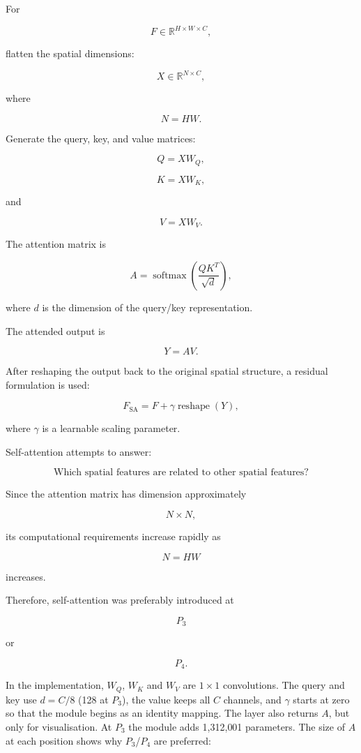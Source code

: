 \documentclass[10pt]{article}
\begin{document}
For

\[
F\in\mathbb{R}^{H\times W\times C},
\]

flatten the spatial dimensions:

\[
X\in\mathbb{R}^{N\times C},
\]

where

\[
N=HW.
\]

Generate the query, key, and value matrices:

\[
Q=XW_Q,
\]

\[
K=XW_K,
\]

and

\[
V=XW_V.
\]

The attention matrix is

\[
A
=
\operatorname{softmax}
\left(
\frac{QK^T}{\sqrt{d}}
\right),
\]

where $d$ is the dimension of the query/key representation.

The attended output is

\[
Y=AV.
\]

After reshaping the output back to the original spatial structure, a residual
formulation is used:

\[
F_{\mathrm{SA}}
=
F
+
\gamma
\operatorname{reshape}(Y),
\]

where $\gamma$ is a learnable scaling parameter.

Self-attention attempts to answer:

\[
\boxed{
\text{Which spatial features are related to other spatial features?}
}
\]

Since the attention matrix has dimension approximately

\[
N\times N,
\]

its computational requirements increase rapidly as

\[
N=HW
\]

increases.

Therefore, self-attention was preferably introduced at

\[
P_3
\]

or

\[
P_4.
\]

In the implementation, $W_Q$, $W_K$ and $W_V$ are $1\times1$ convolutions. The
query and key use $d=C/8$ (128 at $P_3$), the value keeps all $C$ channels, and
$\gamma$ starts at zero so that the module begins as an identity mapping. The
layer also returns $A$, but only for visualisation. At $P_3$ the module adds
1{,}312{,}001 parameters. The size of $A$ at each position shows why
$P_3$/$P_4$ are preferred:
\end{document}
